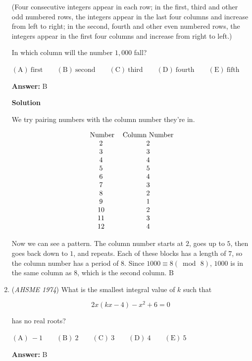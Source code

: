 \begin{enumerate}
 (Four consecutive integers appear in each row; in the first, third and other odd numbered rows, the integers appear in the last four columns and increase from left to right; in the second, fourth and other even numbered rows, the integers appear in the first four columns and increase from right to left.)


 In which column will the number $1,000$ fall?


 $\mathrm{(A)\ } \text{first} \qquad \mathrm{(B) \ }\text{second} \qquad \mathrm{(C) \  } \text{third} \qquad \mathrm{(D) \  } \text{fourth} \qquad \mathrm{(E) \  }\text{fifth}$

 \textbf{Answer: }B



\textbf{Solution}

We try pairing numbers with the column number they're in.

 
 \[\begin{tabular}{c c}\ \text{Number} & \text{Column Number} \\ 2 & 2\\ 3 & 3\\ 4 & 4\\ 5 & 5\\ 6 & 4\\ 7 & 3\\ 8 & 2\\ 9 & 1\\ 10 & 2\\ 11 & 3\\ 12 & 4\\ \end{tabular}\]

 Now we can see a pattern. The column number starts at $2$, goes up to $5$, then goes back down to $1$, and repeats. Each of these blocks has a length of $7$, so the column number has a period of $8$. Since $1000\equiv8(\bmod\,8)$, $1000$ is in the same column as $8$, which is the second column. $\boxed{\text{B}}$



	\item (\textit{AHSME 1974}) What is the smallest integral value of $k$ such that 


 
 \[2x(kx-4)-x^2+6=0\]


 has no real roots?


 $\mathrm{(A)\ } -1 \qquad \mathrm{(B) \ }2 \qquad \mathrm{(C) \  } 3 \qquad \mathrm{(D) \  } 4 \qquad \mathrm{(E) \  }5$

 \textbf{Answer: }B




\end{enumerate}
